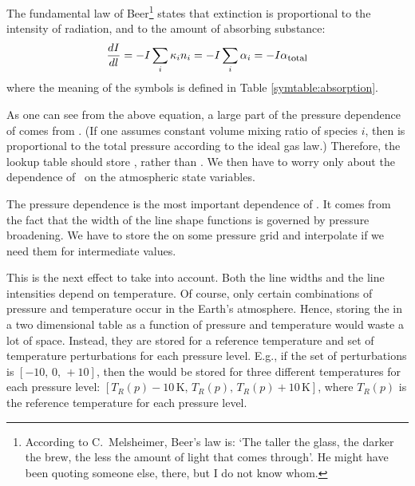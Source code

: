 
The fundamental law of Beer\footnote{According to C.\ Melsheimer,
  Beer's law is: `The taller the glass, the darker the brew, the less
  the amount of light that comes through'. He might have been quoting
  someone else, there, but I do not know whom.} states that extinction
is proportional to the intensity of radiation, and to the amount of
absorbing substance:
\begin{equation}
  \label{eq:lookup:beer}
  \frac{d I}{d l}
  =
  - I \sum_i {\kappa}_{i} {n}_{i}
  =
  - I \sum_i {\alpha}_{i}
  =
  - I {\alpha}_{\mbox{\footnotesize total}}
\end{equation}
where the meaning of the symbols is defined in Table
\ref{symtable:absorption}. 

As one can see from the above equation, a large part of the pressure
dependence of  comes from . (If one assumes
constant volume mixing ratio of species $i$, then  is
proportional to the total pressure according to the ideal gas law.) 
Therefore, the lookup table should store \AbsXsec, rather than
\AbsCoef. We then have to worry only about the dependence of \AbsXsec\
on the atmospheric state variables.


The pressure dependence is the most important dependence of
\AbsXsec. It comes from the fact that the width of the line shape
functions is governed by pressure broadening. We have to store the
\aAbsXsec{i} on some pressure grid and interpolate if we need them for
intermediate values.


This is the next effect to take into account. Both the line widths and
the line intensities depend on temperature. Of course, only certain
combinations of pressure and temperature occur in the Earth's
atmosphere. Hence, storing the  in a two dimensional table
as a function of pressure and temperature would waste a lot of space.
Instead, they are stored for a reference temperature and set of
temperature perturbations for each pressure level. E.g., if the set of
perturbations is $[-10,\, 0,\, +10]$, then the \aAbsXsec{i} would be stored
for three different temperatures for each pressure level:
$[T_R(p)-10\,\mbox{K},\, T_R(p),\, T_R(p)+10\,\mbox{K}]$, where
$T_R(p)$ is the reference temperature for each pressure level.


